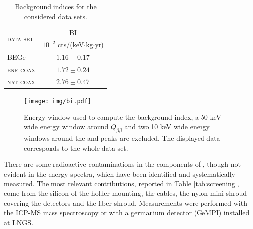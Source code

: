 \begin{table}[b]
	\centering
	\caption{Background indices for the considered data sets.}
	\label{tab:bindex}
	\begin{tabular}{lc}
		\toprule
		\multirow{2}{*}{\textsc{data set}}	&	BI \\
											&	$10^{-2}$ cts/(keV$\cdot$kg$\cdot$yr) \\
		\midrule
		BEGe								&	$1.16\pm0.17$	\\
		\textsc{enr coax}					&	$1.72\pm0.24$	\\
		\textsc{nat coax}					&	$2.76\pm0.47$	\\
		\bottomrule
	\end{tabular}
\end{table}
\begin{figure}
	\centering
	\texttt{[image: img/bi.pdf]}
	\caption{Energy window used to compute the background index, a 50 keV wide energy window around $Q_{\beta\beta}$ and two 10 keV wide energy windows around the  and  peaks are excluded. The displayed data corresponds to the whole {\gerda} data set.}
	\label{fig:bi}
\end{figure}
\newpage%
 There are some radioactive contaminations in the components of {\gerda}, though not evident in the energy spectra, which have been identified and systematically measured. The most relevant contributions, reported in Table \ref{tab:screening}, come from the silicon of the holder mounting, the cables, the nylon mini-shroud covering the detectors and the fiber-shroud. Measurements were performed with the ICP-MS mass spectroscopy or with a germanium detector (GeMPI) installed at LNGS.
